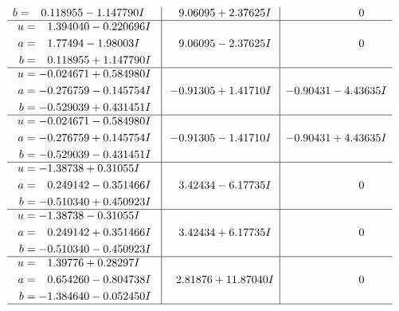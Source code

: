 \documentclass[1p]{elsarticle_modified}
\theoremstyle{definition}
\begin{document}
$$\begin{array}{c|c|c}
\begin{aligned}
b &= \phantom{-}0.118955 - 1.147790 I\end{aligned}
 & \phantom{-}9.06095 + 2.37625 I & \phantom{-0.000000 } 0 \\ \hline\begin{aligned}
u &= \phantom{-}1.394040 - 0.220696 I \\
a &= \phantom{-}1.77494 - 1.98003 I \\
b &= \phantom{-}0.118955 + 1.147790 I\end{aligned}
 & \phantom{-}9.06095 - 2.37625 I & \phantom{-0.000000 } 0 \\ \hline\begin{aligned}
u &= -0.024671 + 0.584980 I \\
a &= -0.276759 - 0.145754 I \\
b &= -0.529039 + 0.431451 I\end{aligned}
 & -0.91305 + 1.41710 I & -0.90431 - 4.43635 I \\ \hline\begin{aligned}
u &= -0.024671 - 0.584980 I \\
a &= -0.276759 + 0.145754 I \\
b &= -0.529039 - 0.431451 I\end{aligned}
 & -0.91305 - 1.41710 I & -0.90431 + 4.43635 I \\ \hline\begin{aligned}
u &= -1.38738 + 0.31055 I \\
a &= \phantom{-}0.249142 - 0.351466 I \\
b &= -0.510340 + 0.450923 I\end{aligned}
 & \phantom{-}3.42434 - 6.17735 I & \phantom{-0.000000 } 0 \\ \hline\begin{aligned}
u &= -1.38738 - 0.31055 I \\
a &= \phantom{-}0.249142 + 0.351466 I \\
b &= -0.510340 - 0.450923 I\end{aligned}
 & \phantom{-}3.42434 + 6.17735 I & \phantom{-0.000000 } 0 \\ \hline\begin{aligned}
u &= \phantom{-}1.39776 + 0.28297 I \\
a &= \phantom{-}0.654260 - 0.804738 I \\
b &= -1.384640 - 0.052450 I\end{aligned}
 & \phantom{-}2.81876 + 11.87040 I & \phantom{-0.000000 } 0\\
 \hline 
 \end{array}$$\newpage$$\begin{array}{c|c|c}  

\end{array}$$
\end{document}
